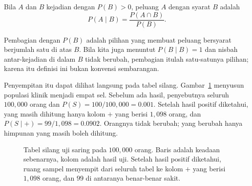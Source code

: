 

\begin{definisi}
Bila $A$ dan $B$ kejadian dengan $P(B)>0$, peluang $A$ dengan syarat $B$ adalah
\[
P(A\mid B)=\frac{P(A\cap B)}{P(B)}.
\]
\end{definisi}

Pembagian dengan $P(B)$ adalah pilihan yang membuat peluang bersyarat berjumlah satu di
atas $B$. Bila kita juga menuntut $P(B\mid B)=1$ dan nisbah antar-kejadian di dalam $B$
tidak berubah, pembagian itulah satu-satunya pilihan; karena itu definisi ini bukan
konvensi sembarangan.

Penyempitan itu dapat dilihat langsung pada tabel silang. Gambar~\ref{fig:silang}
menyusun populasi klinik menjadi empat sel. Sebelum ada hasil, penyebutnya
seluruh $100{,}000$ orang dan $P(S)=100/100{,}000=0.001$. Setelah hasil positif
diketahui, yang masih dihitung hanya kolom $+$ yang berisi $1{,}098$ orang, dan
$P(S\mid+)=99/1{,}098=0.0902$. Orangnya tidak berubah; yang berubah hanya himpunan yang
masih boleh dihitung.

    \begin{figure}[htbp]
\centering
{}
\caption{Tabel silang uji saring pada $100{,}000$ orang. Baris adalah keadaan
sebenarnya, kolom adalah hasil uji. Setelah hasil positif diketahui, ruang sampel
menyempit dari seluruh tabel ke kolom $+$ yang berisi $1{,}098$ orang, dan $99$
di antaranya benar-benar sakit.}
\label{fig:silang}
\end{figure}    

